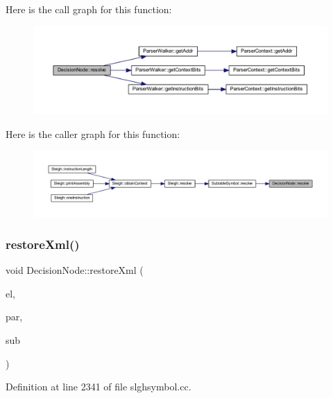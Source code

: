 Here is the call graph for this function\+:
\nopagebreak
\begin{figure}[H]
\begin{center}
\leavevmode
\includegraphics[width=350pt]{class_decision_node_af8bd0d3c14c10f9b43881f1ef493f95a_cgraph}
\end{center}
\end{figure}
Here is the caller graph for this function\+:
\nopagebreak
\begin{figure}[H]
\begin{center}
\leavevmode
\includegraphics[width=350pt]{class_decision_node_af8bd0d3c14c10f9b43881f1ef493f95a_icgraph}
\end{center}
\end{figure}
\mbox{\label{class_decision_node_a6b8d14fdf942a38107cb1633f5065202}} 
\subsubsection{\texorpdfstring{restoreXml()}{restoreXml()}}
{\footnotesize\ttfamily void Decision\+Node\+::restore\+Xml (\begin{DoxyParamCaption}\item[{const \mbox{\hyperlink{class_element}{Element}} $\ast$}]{el,  }\item[{\mbox{\hyperlink{class_decision_node}{Decision\+Node}} $\ast$}]{par,  }\item[{\mbox{\hyperlink{class_subtable_symbol}{Subtable\+Symbol}} $\ast$}]{sub }\end{DoxyParamCaption})}



Definition at line 2341 of file slghsymbol.\+cc.

